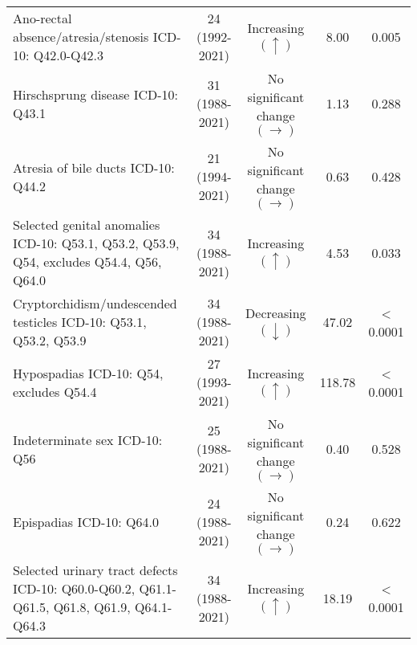 \documentclass[
]{krantz}
\begin{document}
\begin{longtable}[t]{>{\raggedright\arraybackslash}p{4cm}cccc}
Ano-rectal absence/atresia/stenosis\newline  \tiny{ ICD-10: Q42.0-Q42.3} & \makecell[c]{24\\ \tiny{(1992-2021)}} & Increasing $\left(\uparrow \right)$ & 8.00 & 0.005\\
Hirschsprung disease\newline  \tiny{ ICD-10: Q43.1} & \makecell[c]{31\\ \tiny{(1988-2021)}} & \makecell[c]{No significant \\ change $\left(\rightarrow \right)$} & 1.13 & 0.288\\
Atresia of bile ducts\newline  \tiny{ ICD-10: Q44.2} & \makecell[c]{21\\ \tiny{(1994-2021)}} & \makecell[c]{No significant \\ change $\left(\rightarrow \right)$} & 0.63 & 0.428\\
Selected genital anomalies\newline  \tiny{ ICD-10: Q53.1, Q53.2, Q53.9, Q54, excludes Q54.4, Q56, Q64.0} & \makecell[c]{34\\ \tiny{(1988-2021)}} & Increasing $\left(\uparrow \right)$ & 4.53 & 0.033\\
\addlinespace
Cryptorchidism/undescended testicles\newline  \tiny{ ICD-10: Q53.1, Q53.2, Q53.9} & \makecell[c]{34\\ \tiny{(1988-2021)}} & Decreasing $\left(\downarrow \right)$ & 47.02 & < 0.0001\\
Hypospadias\newline  \tiny{ ICD-10: Q54, excludes Q54.4} & \makecell[c]{27\\ \tiny{(1993-2021)}} & Increasing $\left(\uparrow \right)$ & 118.78 & < 0.0001\\
Indeterminate sex\newline  \tiny{ ICD-10: Q56} & \makecell[c]{25\\ \tiny{(1988-2021)}} & \makecell[c]{No significant \\ change $\left(\rightarrow \right)$} & 0.40 & 0.528\\
Epispadias\newline  \tiny{ ICD-10: Q64.0} & \makecell[c]{24\\ \tiny{(1988-2021)}} & \makecell[c]{No significant \\ change $\left(\rightarrow \right)$} & 0.24 & 0.622\\
Selected urinary tract defects\newline  \tiny{ ICD-10: Q60.0-Q60.2, Q61.1-Q61.5, Q61.8, Q61.9, Q64.1-Q64.3} & \makecell[c]{34\\ \tiny{(1988-2021)}} & Increasing $\left(\uparrow \right)$ & 18.19 & < 0.0001\\

\end{longtable}
\end{document}
